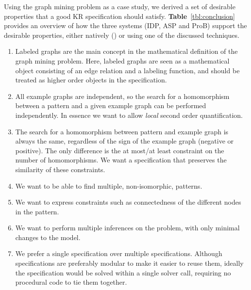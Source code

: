 Using the graph mining problem as a case study, we derived a set of desirable properties that a good KR specification should satisfy. \textbf{Table}~\ref{tbl:conclusion} provides an overview of how the three systems (IDP, ASP and ProB) support the desirable properties, either natively (\checkmark) or using one of the discussed techniques.

\begin{enumerate}[itemsep=0mm]
\item Labeled graphs are the main concept in the mathematical definition of the graph mining problem. 
Here, labeled graphs are seen as a mathematical object consisting of an edge relation and a labeling function, and should be treated as higher order objects in the specification.
\item All example graphs are independent, so the search for a homomorphism between a pattern and a given example graph can be performed independently. 
In essence we want to allow \emph{local} second order quantification.  %
\item The search for a homomorphism between pattern and example graph is always the same, regardless of the sign of the example graph (negative or positive). The only difference is the at most/at least constraint on the number of homomorphisms.
We want a specification that preserves the similarity of these constraints.
\item We want to be able to find multiple, non-isomorphic, patterns.
\item We want to express constraints such as connectedness of the different nodes in the pattern.
\item We want to perform multiple inferences on the problem, with only minimal changes to the model.
\item We prefer a single specification over multiple specifications. 
Although specifications are preferably modular to make it easier to reuse them, ideally the specification would be solved within a single solver call, requiring no procedural code to tie them together.
\end{enumerate}
